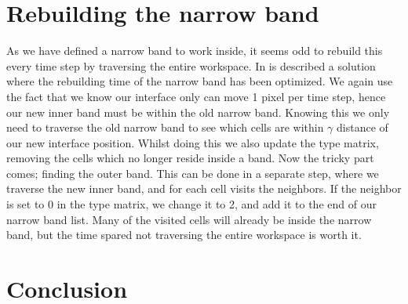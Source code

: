 \section{Rebuilding the narrow band}
As we have defined a narrow band to work inside, it seems odd to
rebuild this every time step by traversing the entire
workspace. In  is described a solution where the
rebuilding time of the narrow band has been optimized. We again use
the fact that we know our interface only can move 1 pixel per time step,
hence our new inner band must be within the old narrow band. Knowing
this we only need to traverse the old narrow band to see which cells
are within $\gamma$ distance of our new interface position. Whilst
doing this we also update the type matrix, removing the cells which no
longer reside inside a band. Now the tricky part comes; finding the
outer band. This can be done in a separate step, where we traverse the
new inner band, and for each cell visits the neighbors. If the
neighbor is set to 0 in the type matrix, we change it to 2, and add it
to the end of our narrow band list. Many of the visited cells will
already be inside the narrow band, but the time spared not traversing
the entire workspace is worth it. 





\section{Conclusion}
